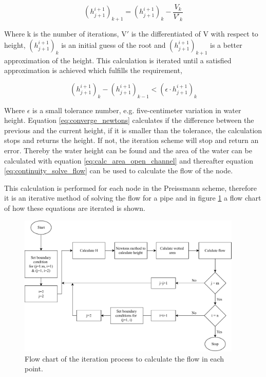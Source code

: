 \begin{equation}\label{eq:newtons_method_height}
     (h_{j+1}^{i+1})_{k+1} =(h_{j+1}^{i+1})_{k} - \frac{V_k}{V'_k}
\end{equation}

Where k is the number of iterations, V$'$ is the differentiated of V with respect to height, $(h_{j+1}^{i+1})_{k}$ is an initial guess of the root and $(h_{j+1}^{i+1})_{k+1}$ is a better approximation of the height. This calculation is iterated until a satisfied approximation is achieved which fulfills the requirement,

\begin{equation}\label{eq:converge_newtons}
    \left(h_{j+1}^{i+1}\right)_{k}-(h_{j+1}^{i+1})_{k-1} < (\epsilon \cdot h_{j+1}^{i+1})_{k}
\end{equation}

Where $\epsilon$ is a small tolerance number, e.g. five-centimeter variation in water height. Equation \ref{eq:converge_newtons} calculates if the difference between the previous and the current height, if it is smaller than the tolerance, the calculation stops and returns the height. If not, the iteration scheme will stop and return an error. Thereby the water height can be found and the area of the water can be calculated with equation \ref{eq:calc_area_open_channel}  and thereafter equation \ref{eq:continuity_solve_flow} can be used to calculate the flow of the node.

This calculation is performed for each node in the Preissmann scheme, therefore it is an iterative method of solving the flow for a pipe and in figure \ref{fig:flow_chart_iteration} a flow chart of how these equations are iterated is shown.
\begin{figure}[H]
    \centering
    \includegraphics[width=0.95\textwidth]{report/simulation/pictures/flow_chart_iteration.pdf}
    \caption{Flow chart of the iteration process to calculate the flow in each point.}
    \label{fig:flow_chart_iteration}
\end{figure}


